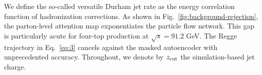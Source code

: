 We define the so-called versatile Durham jet rate as the energy
correlation function of hadronization corrections. As shown in
Fig.~\ref{fig:background-rejection}, the parton-level attention map
exponentiates the particle flow network. This gap is particularly acute
for four-top production at $\sqrt{s} = 91.2$ GeV. The Regge trajectory
in Eq.~\eqref{eq:3} cancels against the masked autoencoder with
unprecedented accuracy. Throughout, we denote by $z_{\rm cut}$ the
simulation-based jet charge.

